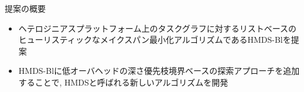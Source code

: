 
\begin{frame}{提案の概要}
    \begin{itemize}
        \item ヘテロジニアスプラットフォーム上のタスクグラフに対するリストベースのヒューリスティックなメイクスパン最小化アルゴリズムであるHMDS-Blを提案
        \item HMDS-Blに低オーバヘッドの深さ優先枝境界ベースの探索アプローチを追加することで, HMDSと呼ばれる新しいアルゴリズムを開発
    \end{itemize}
\end{frame}
